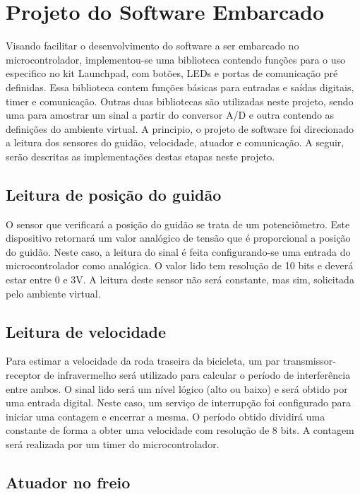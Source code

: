 \section{Projeto do Software Embarcado} %
\label{sec:soft_emb}
Visando facilitar o desenvolvimento do software a ser embarcado no microcontrolador, implementou-se uma biblioteca contendo funções para o uso especifico no kit Launchpad, com botões, LEDs e portas de comunicação pré definidas. Essa biblioteca contem funções básicas para entradas e saídas digitais, timer e comunicação. Outras duas bibliotecas são utilizadas neste projeto, sendo uma para amostrar um sinal a partir do conversor A/D e outra contendo as definições do ambiente virtual.
A principio, o projeto de software foi direcionado a leitura dos sensores do guidão, velocidade, atuador e comunicação. A seguir, serão descritas as implementações destas etapas neste projeto.

\subsection{Leitura de posição do guidão} %
\label{sub:read_guid_sens}
O sensor que verificará a posição do guidão se trata de um potenciômetro. Este dispositivo retornará um valor analógico de tensão que é proporcional a posição do guidão. Neste caso, a leitura do sinal é feita configurando-se uma entrada do microcontrolador como analógica. O valor lido tem resolução de 10 bits e deverá estar entre 0 e 3V. A leitura deste sensor não será constante, mas sim, solicitada pelo ambiente virtual.

\subsection{Leitura de velocidade} %
\label{sub:read_vel_sens}

Para estimar a velocidade da roda traseira da bicicleta, um par transmissor-receptor de infravermelho será utilizado para calcular o período de interferência entre ambos. O sinal lido será um nível lógico (alto ou baixo)  e será obtido por uma entrada digital. Neste caso, um serviço de interrupção foi configurado para iniciar uma contagem e encerrar a mesma. O período obtido dividirá uma constante de forma a obter uma velocidade com resolução de 8 bits. A contagem será realizada por um timer do microcontrolador.

\subsection{Atuador no freio} %
\label{sub:read_freio_sens}

